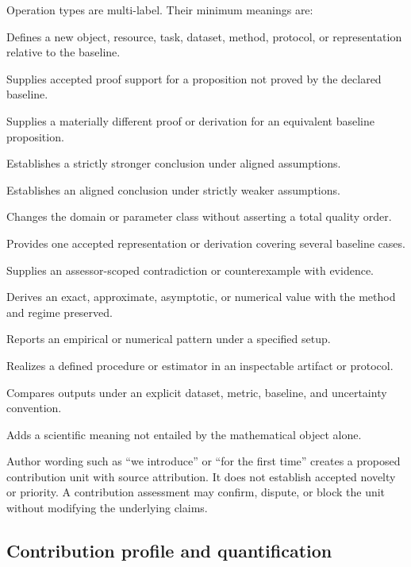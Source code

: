 Operation types are multi-label. Their minimum meanings are:
\begin{description}[style=nextline]
  \item[\status{introduces}.] Defines a new object, resource, task, dataset, method, protocol, or representation relative to the baseline.
  \item[\status{proves}.] Supplies accepted proof support for a proposition not proved by the declared baseline.
  \item[\status{reproves}.] Supplies a materially different proof or derivation for an equivalent baseline proposition.
  \item[\status{strengthens}.] Establishes a strictly stronger conclusion under aligned assumptions.
  \item[\status{weakens\_assumptions}.] Establishes an aligned conclusion under strictly weaker assumptions.
  \item[\status{generalizes}/\status{specializes}.] Changes the domain or parameter class without asserting a total quality order.
  \item[\status{unifies}.] Provides one accepted representation or derivation covering several baseline cases.
  \item[\status{refutes}.] Supplies an assessor-scoped contradiction or counterexample with evidence.
  \item[\status{computes}.] Derives an exact, approximate, asymptotic, or numerical value with the method and regime preserved.
  \item[\status{observes}.] Reports an empirical or numerical pattern under a specified setup.
  \item[\status{implements}.] Realizes a defined procedure or estimator in an inspectable artifact or protocol.
  \item[\status{benchmarks}.] Compares outputs under an explicit dataset, metric, baseline, and uncertainty convention.
  \item[\status{interprets}.] Adds a scientific meaning not entailed by the mathematical object alone.
\end{description}

Author wording such as ``we introduce'' or ``for the first time'' creates a proposed contribution unit with source attribution. It does not establish accepted novelty or priority. A contribution assessment may confirm, dispute, or block the unit without modifying the underlying claims.

\subsection{Contribution profile and quantification}

